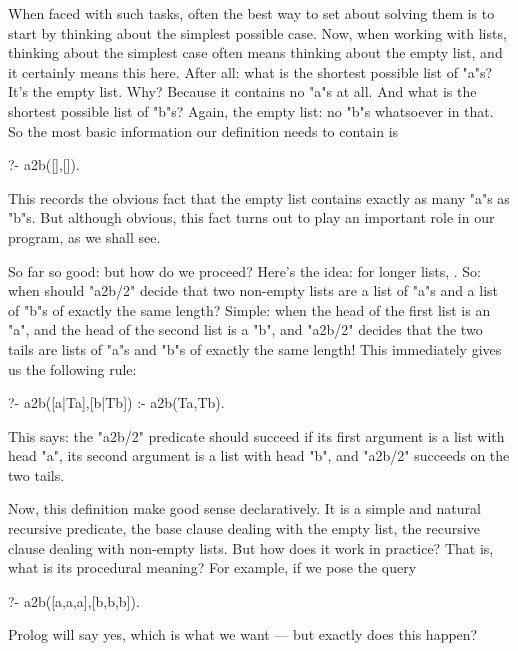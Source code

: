 When faced with such tasks, often the best way to set about solving
them is to start by thinking about the simplest possible case. Now,
when working with lists, thinking about the simplest case often means
thinking about the empty list, and it certainly means this here.
After all: what is the shortest possible list of "a"s?  It's the empty
list. Why? Because it contains no "a"s at all. And what is the
shortest possible list of "b"s? Again, the empty list: no "b"s
whatsoever in that.  So the most basic information our definition
needs to contain is
\begin{LPNcodedisplay}
?- a2b([],[]).
\end{LPNcodedisplay}
This records the obvious fact that the empty list contains exactly as
many "a"s as "b"s. But although obvious, this fact turns out
to play an important role in our program, as we shall see.

 So far so good: but how do we proceed? Here's the idea: for longer
lists, . So: when should "a2b/2"
decide that two non-empty lists are a list of "a"s and a list of
"b"s of exactly the same length? Simple: when the head of the
first list is an "a", and the head of the second list is a
"b", and "a2b/2" decides that the two tails are lists
of "a"s and "b"s of exactly the same length!  This
immediately gives us the following rule:
\begin{LPNcodedisplay}
?- a2b([a|Ta],[b|Tb]) :- a2b(Ta,Tb).
\end{LPNcodedisplay}
This says: the "a2b/2" predicate should succeed if its
first argument is a list with head "a", its second argument is a
list with head "b", and "a2b/2" succeeds on the two
tails.

Now, this definition make good sense declaratively. It is a simple and
natural recursive predicate, the base clause dealing with the empty
list, the recursive clause dealing with non-empty lists.  But how does
it work in practice? That is, what is its procedural meaning?  For
example, if we pose the query
\begin{LPNcodedisplay}
?- a2b([a,a,a],[b,b,b]).
\end{LPNcodedisplay}
Prolog will say yes, which is what we want --- but  exactly does
this happen?


